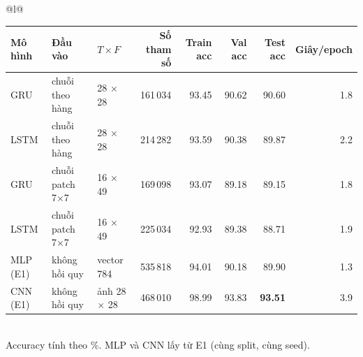 \begin{tabular}{@{}l@{}}
\begin{tabular}{lllrrrrr}
\toprule
Mô hình & Đầu vào & $T \times F$ & Số tham số & Train acc & Val acc & Test acc & Giây/epoch \\
\midrule
GRU & chuỗi theo hàng & 28 × 28 & 161\,034 & 93.45 & 90.62 & 90.60 & 1.8 \\
LSTM & chuỗi theo hàng & 28 × 28 & 214\,282 & 93.59 & 90.38 & 89.87 & 2.2 \\
GRU & chuỗi patch 7×7 & 16 × 49 & 169\,098 & 93.07 & 89.18 & 89.15 & 1.8 \\
LSTM & chuỗi patch 7×7 & 16 × 49 & 225\,034 & 92.93 & 89.38 & 88.71 & 1.9 \\
MLP (E1) & không hồi quy & vector 784 & 535\,818 & 94.01 & 90.18 & 89.90 & 1.3 \\
CNN (E1) & không hồi quy & ảnh 28 × 28 & 468\,010 & 98.99 & 93.83 & \textbf{93.51} & 3.9 \\
\bottomrule
\end{tabular}
\\[2pt]
{\footnotesize Accuracy tính theo \%. MLP và CNN lấy từ E1 (cùng split, cùng seed).}
\end{tabular}
